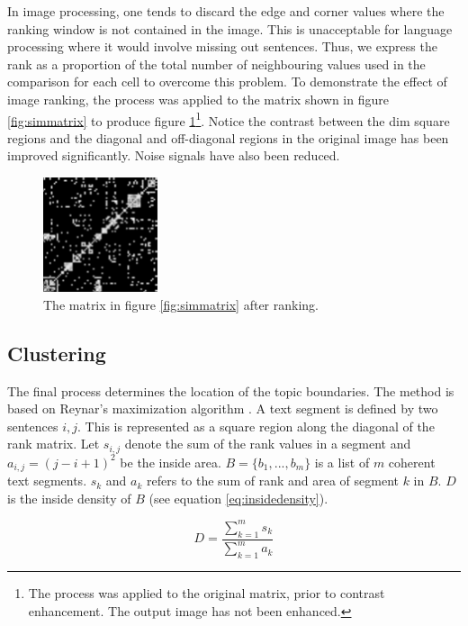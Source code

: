 \documentclass[11pt]{article}
\begin{document}
In image processing, one tends to discard the edge and corner values where the ranking window is not contained in the image. This is unacceptable for language processing where it would involve missing out sentences. Thus, we express the rank as a proportion of the total number of neighbouring values used in the comparison for each cell to overcome this problem. To demonstrate the effect of image ranking, the process was applied to the matrix shown in figure \ref{fig:simmatrix} to produce figure \ref{fig:rankmatrix}\footnote{The process was applied to the original matrix, prior to contrast enhancement. The output image has not been enhanced.}. Notice the contrast between the dim square regions and the diagonal and off-diagonal regions in the original image has been improved significantly. Noise signals have also been reduced.

\begin{figure}[h]
\begin{center}
\includegraphics[width=0.3\textwidth]{rankMatrix.eps}
\end{center}
\caption{The matrix in figure \ref{fig:simmatrix} after ranking.}
\label{fig:rankmatrix}
\end{figure}

\subsection{Clustering}
The final process determines the location of the topic boundaries. The method is based on Reynar's maximization algorithm \cite{reynar_1998}. A text segment is defined by two sentences $i,j$. This is represented as a square region along the diagonal of the rank matrix. Let $s_{i,j}$ denote the sum of the rank values in a segment and $a_{i,j} = (j-i+1)^2$ be the inside area. $B = \{b_1,...,b_m\}$ is a list of $m$ coherent text segments. $s_k$ and $a_k$ refers to the sum of rank and area of segment $k$ in $B$. $D$ is the inside density of $B$ (see equation \ref{eq:insidedensity}).

\begin{equation}
D = \frac{\sum_{k=1}^{m} s_k}{\sum_{k=1}^{m} a_k}
\label{eq:insidedensity}
\end{equation}
\end{document}
